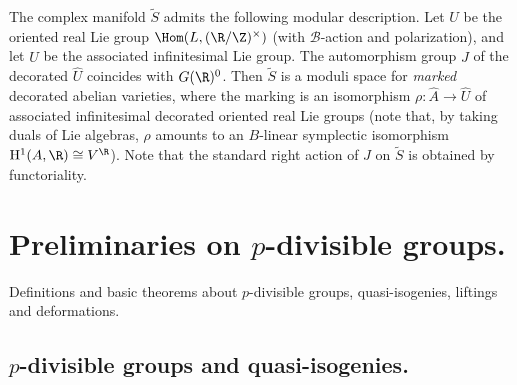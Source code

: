 \begin{para}
 \bigskip
 The complex manifold $\tilde S$ admits the following
 modular description. Let $U$ be the oriented real Lie group
 $\Hom(L,(\R/\Z)^\times)$ (with $\mathcal{B}$-action and polarization),
 and let $\hat U$ be the associated infinitesimal Lie group. The
 automorphism group $J$ of the decorated $\hat U$ coincides with
 $G(\R)^0$. Then $\tilde S$ is a moduli space for {\it marked} decorated
 abelian varieties, where the marking is an isomorphism $\rho: \hat
 A\rightarrow \hat U$ of associated infinitesimal decorated oriented
 real Lie groups (note that, by taking duals of Lie algebras, $\rho$
 amounts to an $B$-linear symplectic isomorphism
 $\mathrm{H}^1(A,\R)\cong V^{\R}$). Note that the standard right action
 of $J$ on $\tilde S$ is obtained by functoriality.

\newpage
\section{Preliminaries on $p$-divisible groups.}\label{sec:2}

\begin{abst}
 Definitions and basic theorems about $p$-divisible groups,
 quasi-isogenies, liftings and deformations.
\end{abst}
\end{para}

\subsection{$p$-divisible groups and quasi-isogenies.}\label{sub:2.1}

